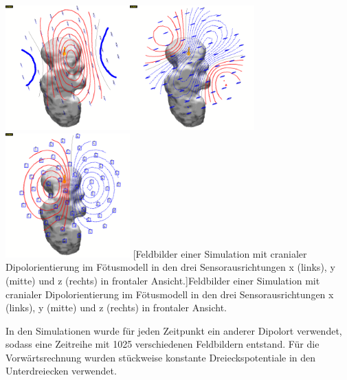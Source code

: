\begin{center}
\includegraphics[width=4.791cm,height=4.791cm]{BA-img/BA-img11.png}\includegraphics[width=4.791cm,height=4.791cm]{BA-img/BA-img12.png}\includegraphics[width=4.791cm,height=4.791cm]{BA-img/BA-img13.png}
[Feldbilder einer Simulation mit cranialer
Dipolorientierung im Fötusmodell in den drei Sensorausrichtungen x
(links), y (mitte) und z (rechts) in frontaler Ansicht.]{Feldbilder
einer Simulation mit cranialer Dipolorientierung im Fötusmodell in den
drei Sensorausrichtungen x (links), y (mitte) und z (rechts) in
frontaler Ansicht.}

\end{center}
In den Simulationen wurde für jeden Zeitpunkt ein anderer Dipolort
verwendet, sodass eine Zeitreihe mit 1025 verschiedenen Feldbildern
entstand. Für die Vorwärtsrechnung wurden stückweise konstante
Dreieckspotentiale in den Unterdreiecken verwendet.

